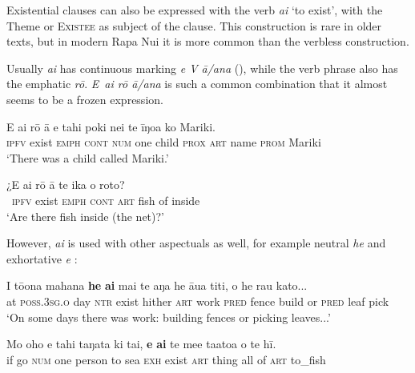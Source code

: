 Existential clauses can also be expressed with the verb \textit{ai} ‘to exist’, with the Theme or \textsc{Existee} as subject of the clause. This construction is rare in older texts, but in modern Rapa Nui it is more common than the verbless construction.

Usually \textit{ai} has continuous  marking \textit{e V {\ꞌ}ā}\textit{/{\ꞌ}ana} (), while the verb phrase also has the emphatic  \textit{rō}. \textit{E~ai rō {\ꞌ}ā/{\ꞌ}ana} is such a common combination that it almost seems to be a frozen expression. 

\ea\label{ex:9.62}
\gll E ai rō {\ꞌ}ā e tahi poki nei te {\ꞌ}īŋoa ko Mariki. \\
\textsc{ipfv} exist \textsc{emph} \textsc{cont} \textsc{num} one child \textsc{prox} \textsc{art} name \textsc{prom} Mariki \\

\glt 
‘There was a child called Mariki.’ \textstyleExampleref{[R380.001]} 
\z

\ea\label{ex:9.63}
\gll ¿E ai rō {\ꞌ}ā te ika o roto? \\
~\textsc{ipfv} exist \textsc{emph} \textsc{cont} \textsc{art} fish of inside \\

\glt
‘Are there fish inside (the net)?’ \textstyleExampleref{[R241.058]} 
\z

However, \textit{ai} is used with other aspectuals as well, for example neutral \textit{he}  and exhortative \textit{e} :

\ea\label{ex:9.64}
\gll {\ꞌ}I tō{\ꞌ}ona mahana \textbf{he} \textbf{ai} mai te aŋa he {\ꞌ}āua titi, {\ꞌ}o he rau kato...\\
at \textsc{poss.3sg.o} day \textsc{ntr} exist hither \textsc{art} work \textsc{pred} fence build or \textsc{pred} leaf pick\\

\glt 
‘On some days there was work: building fences or picking leaves...’ \textstyleExampleref{[R380.084]} 
\z

\ea\label{ex:9.65}
\gll Mo oho e tahi taŋata ki tai, \textbf{e} \textbf{ai} te me{\ꞌ}e ta{\ꞌ}ato{\ꞌ}a o te hī. \\
if go \textsc{num} one person to sea \textsc{exh} exist \textsc{art} thing all of \textsc{art} to\_fish \\

